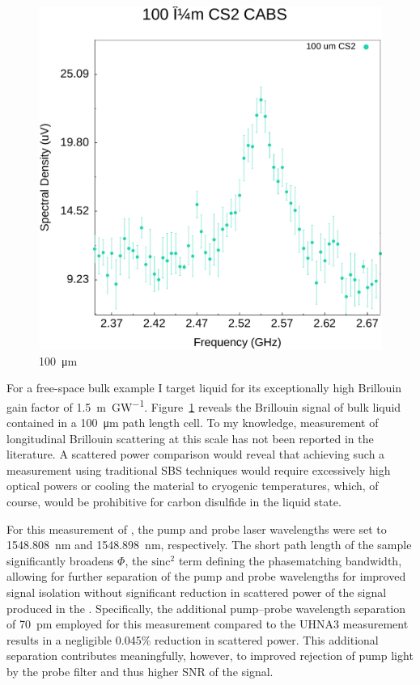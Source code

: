 \begin{figure}[t]
  \centering
  \includegraphics[width=\textwidth]{figs/4-CABS/100umCS2.pdf}
  \caption{\SI{100}{\micro\meter} }
  \label{fig:100umCS2}
\end{figure}

\FloatBarrier

For a free-space bulk example I target liquid  for its exceptionally high Brillouin gain factor of \SI{1.5}{\meter\per\giga\watt}.\cite{boyd2020nonlinear} Figure~\ref{fig:100umCS2} reveals the Brillouin signal of bulk  liquid contained in a \SI{100}{\micro\meter} path length cell. To my knowledge, measurement of longitudinal Brillouin scattering at this scale has not been reported in the literature. A scattered power comparison would reveal that achieving such a measurement using traditional \ac{SBS} techniques would require excessively high optical powers or cooling the material to cryogenic temperatures, which, of course, would be prohibitive for carbon disulfide in the liquid state.

For this measurement of , the pump and probe laser wavelengths were set to \SI{1548.808}{\nano\meter} and \SI{1548.898}{\nano\meter}, respectively. The short path length of the sample significantly broadens \(\Phi\), the \(\mathrm{sinc^2}\) term defining the phasematching bandwidth, allowing for further separation of the pump and probe wavelengths for improved signal isolation without significant reduction in scattered power of the signal produced in the . Specifically, the additional pump--probe wavelength separation of \SI{70}{\pico\meter} employed for this measurement compared to the UHNA3 measurement results in a negligible 0.045\% reduction in scattered power. This additional separation contributes meaningfully, however, to improved rejection of pump light by the probe filter and thus higher SNR of the signal.


